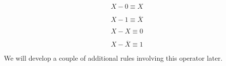 \begin{equation}
    X - 0 \equiv X
\end{equation}

\begin{equation}
    X - 1 \equiv \overline{X}
\end{equation}
     
\begin{equation}
    X - X \equiv 0
\end{equation}

\begin{equation}
    X - \overline{X} \equiv 1
\end{equation}

We will develop a couple of additional rules involving this operator later.








